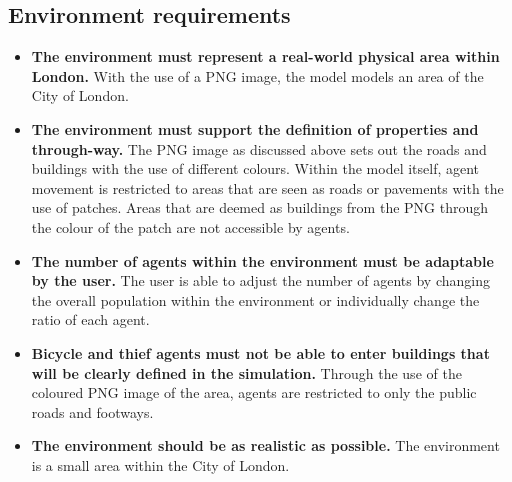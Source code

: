 \documentclass[11pt]{informatics-report}
\begin{document}
\subsection{Environment requirements}
\begin{itemize}
	\item \textbf{The environment must represent a real-world physical area within London.} With the use of a PNG image, the model models an area of the City of London.
	\item \textbf{The environment must support the definition of properties and through-way.} The PNG image as discussed above sets out the roads and buildings with the use of different colours. Within the model itself, agent movement is restricted to areas that are seen as roads or pavements with the use of patches. Areas that are deemed as buildings from the PNG through the colour of the patch are not accessible by agents.
	\item \textbf{The number of agents within the environment must be adaptable by the user.} The user is able to adjust the number of agents by changing the overall population within the environment or individually change the ratio of each agent.
	\item \textbf{Bicycle and thief agents must not be able to enter buildings that will be clearly defined in the simulation.} Through the use of the coloured PNG image of the area, agents are restricted to only the public roads and footways.
	\item \textbf{The environment should be as realistic as possible.} The environment is a small area within the City of London.
\end{itemize}
\end{document}
